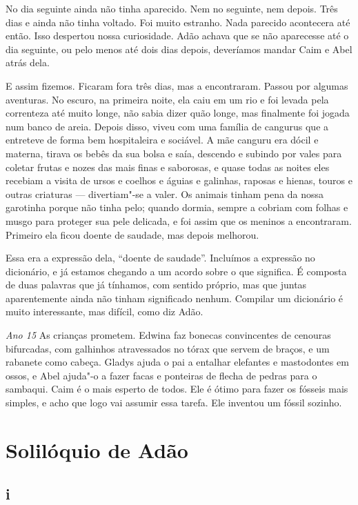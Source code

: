 No dia seguinte ainda não tinha aparecido. Nem no seguinte, nem depois.
Três dias e ainda não tinha voltado. Foi muito estranho. Nada parecido
acontecera até então. Isso despertou nossa curiosidade. Adão achava
que se não aparecesse até o dia seguinte, ou pelo menos até dois dias depois,     
deveríamos mandar Caim e Abel atrás dela.

E assim fizemos. Ficaram fora três dias, mas a encontraram. Passou por algumas
aventuras. No escuro, na primeira noite, ela caiu em um rio e foi levada pela
correnteza até muito longe, não sabia dizer quão longe, mas finalmente foi
jogada num banco de areia. Depois disso, viveu com uma família de cangurus
que a entreteve de forma bem hospitaleira e sociável. A mãe canguru
era dócil e materna, tirava os bebês da sua bolsa e saía, descendo e subindo
por vales para coletar frutas e nozes das mais finas e saborosas, e quase todas
as noites eles recebiam a visita de ursos e coelhos e águias e galinhas, raposas e
hienas, touros e outras criaturas --- divertiam"-se a valer. Os animais tinham
pena da nossa garotinha porque não tinha pelo; quando dormia, sempre a cobriam
com folhas e musgo para proteger sua pele delicada, e foi assim que os
meninos a encontraram. Primeiro ela ficou doente de saudade, mas depois
melhorou.

Essa era a expressão dela, “doente de saudade”. Incluímos a expressão no dicionário, e
já estamos chegando a um acordo sobre o que significa. É composta de duas palavras
que já tínhamos, com sentido próprio, mas que juntas aparentemente ainda não
tinham significado nenhum. Compilar um dicionário é muito interessante,
mas difícil, como diz Adão.

\textit{Ano 15} As crianças prometem. Edwina faz bonecas convincentes de cenouras
bifurcadas, com galhinhos atravessados no tórax que servem de braços, e um
rabanete como cabeça. Gladys ajuda o pai a entalhar elefantes e mastodontes em
ossos, e Abel ajuda"-o a fazer facas e ponteiras de flecha de pedras para o 
sambaqui. Caim é o mais esperto de todos. Ele é ótimo para fazer os 
fósseis mais simples, e acho que logo vai assumir essa tarefa. Ele inventou um 
fóssil sozinho.

\chapter{Solilóquio de Adão}
\medskip


\section{i}

